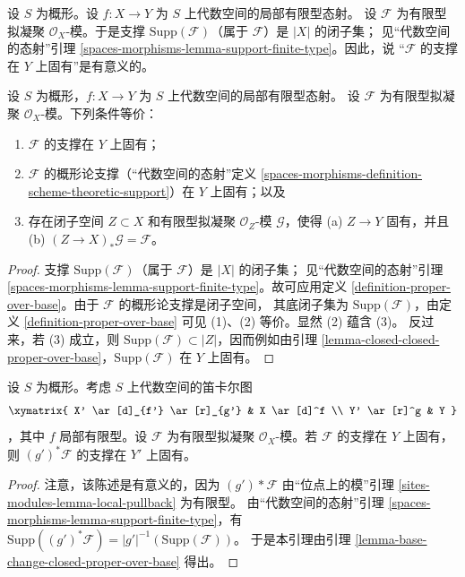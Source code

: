\noindent
设 $S$ 为概形。设 $f : X \to Y$ 为 $S$ 上代数空间的局部有限型态射。
设 $\mathcal{F}$ 为有限型拟凝聚 $\mathcal{O}_X$-模。于是支撑
$\text{Supp}(\mathcal{F})$（属于 $\mathcal{F}$）是 $|X|$ 的闭子集；
见“代数空间的态射”引理
\ref{spaces-morphisms-lemma-support-finite-type}。因此，说
“$\mathcal{F}$ 的支撑在 $Y$ 上固有”是有意义的。

\begin{lemma}
\label{lemma-module-support-proper-over-base}
设 $S$ 为概形，$f : X \to Y$ 为 $S$ 上代数空间的局部有限型态射。
设 $\mathcal{F}$ 为有限型拟凝聚 $\mathcal{O}_X$-模。下列条件等价：
\begin{enumerate}
\item $\mathcal{F}$ 的支撑在 $Y$ 上固有；
\item $\mathcal{F}$ 的概形论支撑（“代数空间的态射”定义
\ref{spaces-morphisms-definition-scheme-theoretic-support}）在 $Y$ 上固有；以及
\item 存在闭子空间 $Z \subset X$ 和有限型拟凝聚
$\mathcal{O}_Z$-模 $\mathcal{G}$，使得 (a) $Z \to Y$ 固有，并且 (b)
$(Z \to X)_*\mathcal{G} = \mathcal{F}$。
\end{enumerate}
\end{lemma}

\begin{proof}
支撑 $\text{Supp}(\mathcal{F})$（属于 $\mathcal{F}$）是 $|X|$ 的闭子集；
见“代数空间的态射”引理
\ref{spaces-morphisms-lemma-support-finite-type}。故可应用定义
\ref{definition-proper-over-base}。由于 $\mathcal{F}$ 的概形论支撑是闭子空间，
其底闭子集为 $\text{Supp}(\mathcal{F})$，由定义
\ref{definition-proper-over-base} 可见 (1)、(2) 等价。显然 (2) 蕴含 (3)。
反过来，若 (3) 成立，则
$\text{Supp}(\mathcal{F}) \subset |Z|$，因而例如由引理
\ref{lemma-closed-closed-proper-over-base}，$\text{Supp}(\mathcal{F})$
在 $Y$ 上固有。
\end{proof}

\begin{lemma}
\label{lemma-base-change-module-support-proper-over-base}
设 $S$ 为概形。考虑 $S$ 上代数空间的笛卡尔图
$$
\xymatrix{
X' \ar[d]_{f'} \ar[r]_{g'} & X \ar[d]^f \\
Y' \ar[r]^g & Y
}
$$
，其中 $f$ 局部有限型。设 $\mathcal{F}$ 为有限型拟凝聚
$\mathcal{O}_X$-模。若 $\mathcal{F}$ 的支撑在 $Y$ 上固有，则
$(g')^*\mathcal{F}$ 的支撑在 $Y'$ 上固有。
\end{lemma}

\begin{proof}
注意，该陈述是有意义的，因为 $(g')*\mathcal{F}$ 由“位点上的模”引理
\ref{sites-modules-lemma-local-pullback} 为有限型。 %
由“代数空间的态射”引理
\ref{spaces-morphisms-lemma-support-finite-type}，有
$\text{Supp}((g')^*\mathcal{F}) = |g'|^{-1}(\text{Supp}(\mathcal{F}))$。
于是本引理由引理
\ref{lemma-base-change-closed-proper-over-base} 得出。
\end{proof}

